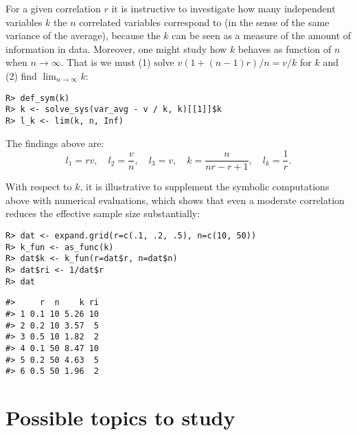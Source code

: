 For a given correlation \(r\) it is instructive to investigate how many
independent variables \(k\) the \(n\) correlated variables correspond to
(in the sense of the same variance of the average), because the \(k\)
can be seen as a measure of the amount of information in data.
Moreover, one might study how \(k\) behaves as function of \(n\)
when \(n \rightarrow \infty\).
That is we must (1) solve \(v (1 + (n-1)r)/n = v/k\) for \(k\)
and (2) find \(\lim_{n\rightarrow\infty} k\):

\begin{verbatim}
R> def_sym(k)
R> k <- solve_sys(var_avg - v / k, k)[[1]]$k
R> l_k <- lim(k, n, Inf)
\end{verbatim}

The findings above are:
\[
l_1 = r v, \quad
l_2 = \frac{v}{n}, \quad
l_3 = v, \quad
k = \frac{n}{n r - r + 1}, \quad 
l_k = \frac{1}{r} .
\]

With respect to \(k\), it is illustrative to supplement the symbolic
computations above with numerical evaluations, which shows that
even a moderate correlation reduces the effective sample size substantially:

\begin{verbatim}
R> dat <- expand.grid(r=c(.1, .2, .5), n=c(10, 50))
R> k_fun <- as_func(k)
R> dat$k <- k_fun(r=dat$r, n=dat$n)
R> dat$ri <- 1/dat$r
R> dat
\end{verbatim}

\begin{verbatim}
#>     r  n    k ri
#> 1 0.1 10 5.26 10
#> 2 0.2 10 3.57  5
#> 3 0.5 10 1.82  2
#> 4 0.1 50 8.47 10
#> 5 0.2 50 4.63  5
#> 6 0.5 50 1.96  2
\end{verbatim}

\hypertarget{possible-topics-to-study}{%
\section{Possible topics to study}\label{possible-topics-to-study}}


